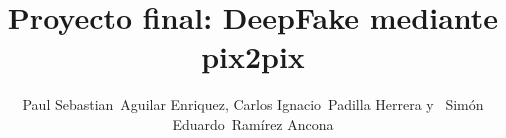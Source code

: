 \documentclass[10pt,journal,compsoc]{IEEEtran}\usepackage[T1]{fontenc}                              %
\begin{document}
%
\title{Proyecto final: DeepFake mediante pix2pix}
%
%
%
%

\author{Paul Sebastian~Aguilar Enriquez,
	Carlos Ignacio~Padilla Herrera
	y ~Simón Eduardo~Ramírez Ancona%
}

% 
%
\end{document}
